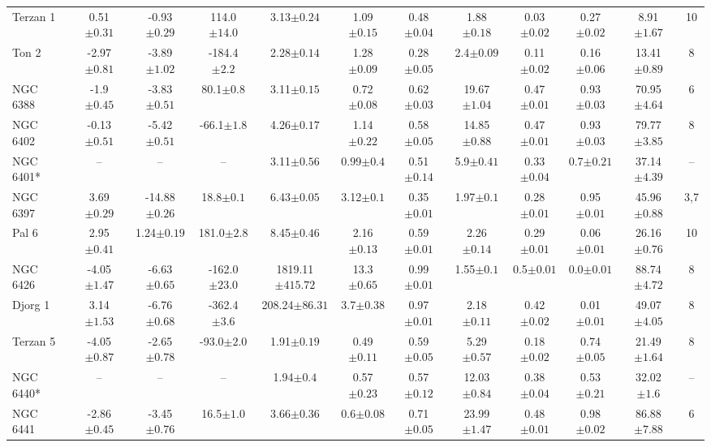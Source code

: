 \begin{landscape}
\begin{table}
\begin{tabular}{lccccccccccc}
Terzan 1 & 0.51$\pm{0.31}$ & -0.93$\pm{0.29}$ & 114.0$\pm{14.0}$ & 3.13$\pm{0.24}$ & 1.09$\pm{0.15}$ & 0.48$\pm{0.04}$ & 1.88$\pm{0.18}$ & 0.03$\pm{0.02}$ & 0.27$\pm{0.02}$ & 8.91$\pm{1.67}$&10 \\ 
Ton 2 & -2.97$\pm{0.81}$ & -3.89$\pm{1.02}$ & -184.4$\pm{2.2}$ & 2.28$\pm{0.14}$ & 1.28$\pm{0.09}$ & 0.28$\pm{0.05}$ & 2.4$\pm{0.09}$ & 0.11$\pm{0.02}$ & 0.16$\pm{0.06}$ & 13.41$\pm{0.89}$&8 \\ 
NGC 6388 & -1.9$\pm{0.45}$ & -3.83$\pm{0.51}$ & 80.1$\pm{0.8}$ & 3.11$\pm{0.15}$ & 0.72$\pm{0.08}$ & 0.62$\pm{0.03}$ & 19.67$\pm{1.04}$ & 0.47$\pm{0.01}$ & 0.93$\pm{0.03}$ & 70.95$\pm{4.64}$&6 \\ 
NGC 6402 & -0.13$\pm{0.51}$ & -5.42$\pm{0.51}$ & -66.1$\pm{1.8}$ & 4.26$\pm{0.17}$ & 1.14$\pm{0.22}$ & 0.58$\pm{0.05}$ & 14.85$\pm{0.88}$ & 0.47$\pm{0.01}$ & 0.93$\pm{0.03}$ & 79.77$\pm{3.85}$&8 \\ 
NGC 6401* & -- & -- & -- & 3.11$\pm{0.56}$ & 0.99$\pm{0.4}$ & 0.51$\pm{0.14}$ & 5.9$\pm{0.41}$ & 0.33$\pm{0.04}$ & 0.7$\pm{0.21}$ & 37.14$\pm{4.39}$&-- \\ 
NGC 6397 & 3.69$\pm{0.29}$ & -14.88$\pm{0.26}$ & 18.8$\pm{0.1}$ & 6.43$\pm{0.05}$ & 3.12$\pm{0.1}$ & 0.35$\pm{0.01}$ & 1.97$\pm{0.1}$ & 0.28$\pm{0.01}$ & 0.95$\pm{0.01}$ & 45.96$\pm{0.88}$&3,7 \\ 
Pal 6 & 2.95$\pm{0.41}$ & 1.24$\pm{0.19}$ & 181.0$\pm{2.8}$ & 8.45$\pm{0.46}$ & 2.16$\pm{0.13}$ & 0.59$\pm{0.01}$ & 2.26$\pm{0.14}$ & 0.29$\pm{0.01}$ & 0.06$\pm{0.01}$ & 26.16$\pm{0.76}$&10 \\ 
NGC 6426 & -4.05$\pm{1.47}$ & -6.63$\pm{0.65}$ & -162.0$\pm{23.0}$ & 1819.11$\pm{415.72}$ & 13.3$\pm{0.65}$ & 0.99$\pm{0.01}$ & 1.55$\pm{0.1}$ & 0.5$\pm{0.01}$ & 0.0$\pm{0.01}$ & 88.74$\pm{4.72}$&8 \\ 
Djorg 1 & 3.14$\pm{1.53}$ & -6.76$\pm{0.68}$ & -362.4$\pm{3.6}$ & 208.24$\pm{86.31}$ & 3.7$\pm{0.38}$ & 0.97$\pm{0.01}$ & 2.18$\pm{0.11}$ & 0.42$\pm{0.02}$ & 0.01$\pm{0.01}$ & 49.07$\pm{4.05}$&8 \\ 
Terzan 5 & -4.05$\pm{0.87}$ & -2.65$\pm{0.78}$ & -93.0$\pm{2.0}$ & 1.91$\pm{0.19}$ & 0.49$\pm{0.11}$ & 0.59$\pm{0.05}$ & 5.29$\pm{0.57}$ & 0.18$\pm{0.02}$ & 0.74$\pm{0.05}$ & 21.49$\pm{1.64}$&8 \\ 
NGC 6440* & -- & -- & -- & 1.94$\pm{0.4}$ & 0.57$\pm{0.23}$ & 0.57$\pm{0.12}$ & 12.03$\pm{0.84}$ & 0.38$\pm{0.04}$ & 0.53$\pm{0.21}$ & 32.02$\pm{1.6}$&-- \\ 
NGC 6441 & -2.86$\pm{0.45}$ & -3.45$\pm{0.76}$ & 16.5$\pm{1.0}$ & 3.66$\pm{0.36}$ & 0.6$\pm{0.08}$ & 0.71$\pm{0.05}$ & 23.99$\pm{1.47}$ & 0.48$\pm{0.01}$ & 0.98$\pm{0.02}$ & 86.88$\pm{7.88}$&6 \\ 

\hline
\end{tabular}
\contcaption{}
\label{summary}
\end{table}
\end{landscape}



